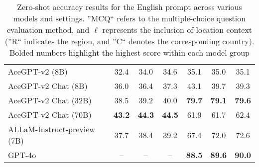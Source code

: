 \begin{table*}[t]
{\begin{tabular}{lcccccc}
\hdashline
AceGPT-v2 (8B)                                & 32.4         & 34.0           & 34.6                     & 35.1         & 35.0           & 35.1                      \\
AceGPT-v2 Chat (8B)                           & 36.0         & 36.4           & 37.3                     & 43.1         & 39.7           & 39.3                      \\
AceGPT-v2 Chat (32B)                          & 38.5         & 39.2            & 40.0                     & \textbf{79.7}         & \textbf{79.1}           & \textbf{79.6}                      \\ 

AceGPT-v2 Chat (70B)                          & \textbf{43.2}         & \textbf{44.3}           & \textbf{44.5}                     & 61.9         & 61.7           & 62.4                      \\
\hdashline
ALLaM-Instruct-preview (7B)                           & 37.7         & 38.4           & 39.2                      & 67.4         & 72.0            & 72.6                         \\ 

\hline
GPT-4o                                        &     --          &                -- & --                          & \textbf{88.5}         & \textbf{89.6}            & \textbf{90.0}                        \\
\hline
\end{tabular}%
}
\caption{Zero-shot accuracy results for the English prompt across various models and settings. ''MCQ`` refers to the multiple-choice question evaluation method, and  $\ell$ represents the inclusion of location context (''R`` indicates the region, and ''C`` denotes the corresponding country). Bolded numbers highlight the highest score within each model group}
\label{tab:model_scores}
\end{table*}